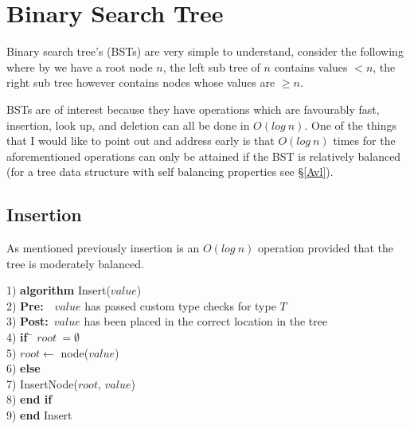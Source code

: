 \chapter{Binary Search Tree} \label{bst}
Binary search tree's (BSTs) are very simple to understand, consider the following where by we have a root node $n$, the left sub tree of $n$ contains values $< n$, the right sub tree however contains nodes whose values are $\geq n$.

BSTs are of interest because they have operations which are favourably fast, insertion, look up, and deletion can all be done in $O(log~n)$. One of the things that I would like to point out and address early is that $O(log~n)$ times for the aforementioned operations can only be attained if the BST is relatively balanced (for a tree data structure with self balancing properties see \S\ref{Avl}). 

\section{Insertion}
As mentioned previously insertion is an $O(log~n)$ operation provided that the tree is moderately balanced.

\begin{tabbing}
1)  \textbf{alg}\= \textbf{orithm} Insert($value$) \\
2)  \> \textbf{Pre:}~~$value$ has passed custom type checks for type $T$ \\
3)  \> \textbf{Post:}~$value$ has been placed in the correct location in the tree \\
4)  \> \textbf{if}~\= $root~= \emptyset$ \\
5)  \> \> $root \leftarrow$ node($value$) \\
6)  \> \textbf{else} \\
7)  \> \> InsertNode($root$, $value$) \\
8)  \> \textbf{end if} \\
9)  \textbf{end} Insert \\
\end{tabbing}

